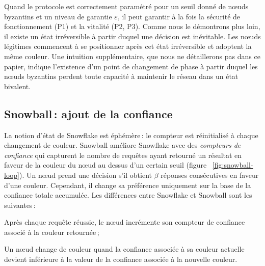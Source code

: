 \documentclass[letterpaper,twocolumn,10pt]{article}
\theoremstyle{definition}
\begin{document}
Quand le protocole est correctement paramétré pour un seuil donné de nœuds byzantins et un niveau de garantie
$\varepsilon$, il peut garantir à la fois la sécurité de fonctionnement (P1) et la vitalité (P2, P3).
Comme nous le démontrons plus loin, il existe un état irréversible à partir duquel une décision est inévitable. Les nœuds
légitimes commencent à se positionner après cet état irréversible et adoptent la même couleur. Une intuition
supplémentaire, que nous ne détaillerons pas dans ce papier, indique l'existence d'un point de changement de phase à
partir duquel les nœuds byzantins perdent toute capacité à maintenir le réseau dans un état bivalent.



\subsection{Snowball\,: ajout de la confiance}

La notion d'état de Snowflake est éphémère\,: le compteur est réinitialisé à chaque changement de couleur.
Snowball améliore Snowflake avec des \emph{compteurs de confiance} qui capturent le nombre de requêtes ayant retourné
un résultat en faveur de la couleur du nœud au dessus d'un certain seuil (figure ~\ref{fig:snowball-loop}).
Un nœud prend une décision s'il obtient $\beta$ réponses consécutives en faveur d'une couleur. Cependant, il change
sa préférence uniquement sur la base de la confiance totale accumulée. Les différences entre Snowflake et Snowball
sont les suivantes\,:

\begin{compactenum}
    \item Après chaque requête réussie, le nœud incrémente son compteur de confiance associé à la couleur retournée\,;
    \item Un nœud change de couleur quand la confiance associée à sa couleur actuelle devient inférieure à la
      valeur de la confiance associée à la nouvelle couleur.
\end{compactenum}
\end{document}
